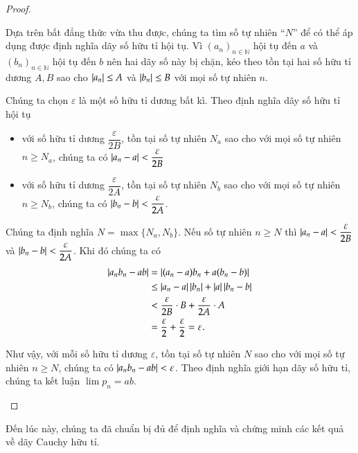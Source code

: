 \begin{proof}
\begin{enumerate}[label={(\roman*)}]
              Dựa trên bất đẳng thức vừa thu được, chúng ta tìm số tự nhiên ``$N$'' để có thể áp dụng được định nghĩa dãy số hữu tỉ hội tụ. Vì ${(a_{n})}_{n\in\mathbb{N}}$ hội tụ đến $a$ và ${(b_{n})}_{n\in\mathbb{N}}$ hội tụ đến $b$ nên hai dãy số này bị chặn, kéo theo tồn tại hai số hữu tỉ dương $A, B$ sao cho $\left\vert{a_{n}}\right\vert\leq A$ và $\left\vert{b_{n}}\right\vert\leq B$ với mọi số tự nhiên $n$.

              Chúng ta chọn $\varepsilon$ là một số hữu tỉ dương bất kì. Theo định nghĩa dãy số hữu tỉ hội tụ
              \begin{itemize}
                  \item với số hữu tỉ dương $\dfrac{\varepsilon}{2B}$, tồn tại số tự nhiên $N_{a}$ sao cho với mọi số tự nhiên $n\geq N_{a}$, chúng ta có $\left\vert{a_{n} - a}\right\vert < \dfrac{\varepsilon}{2B}$
                  \item với số hữu tỉ dương $\dfrac{\varepsilon}{2A}$, tồn tại số tự nhiên $N_{b}$ sao cho với mọi số tự nhiên $n\geq N_{b}$, chúng ta có $\left\vert{b_{n} - b}\right\vert < \dfrac{\varepsilon}{2A}$.
              \end{itemize}

              Chúng ta định nghĩa $N = \max\{ N_{a}, N_{b}\}$. Nếu số tự nhiên $n\geq N$ thì $\left\vert{a_{n} - a}\right\vert < \dfrac{\varepsilon}{2B}$ và $\left\vert{b_{n} - b}\right\vert < \dfrac{\varepsilon}{2A}$. Khi đó chúng ta có
              \begin{align*}
                  \left\vert{a_{n}b_{n} - ab}\right\vert & = \left\vert{(a_{n} - a)b_{n} + a(b_{n} - b)}\right\vert                         \\
                                        & \leq \left\vert{a_{n} - a}\right\vert\left\vert{b_{n}}\right\vert + \left\vert{a}\right\vert\left\vert{b_{n} - b}\right\vert        \\
                                        & < \frac{\varepsilon}{2B}\cdot B + \frac{\varepsilon}{2A}\cdot A \\
                                        & = \frac{\varepsilon}{2} + \frac{\varepsilon}{2} = \varepsilon.
              \end{align*}

              Như vậy, với mỗi số hữu tỉ dương $\varepsilon$, tồn tại số tự nhiên $N$ sao cho với mọi số tự nhiên $n\geq N$, chúng ta có $\left\vert{a_{n}b_{n} - ab}\right\vert < \varepsilon$. Theo định nghĩa giới hạn dãy số hữu tỉ, chúng ta kết luận $\lim p_{n} = ab$.
    \end{enumerate}
\end{proof}

Đến lúc này, chúng ta đã chuẩn bị đủ để định nghĩa và chứng minh các kết quả về dãy Cauchy hữu tỉ.

